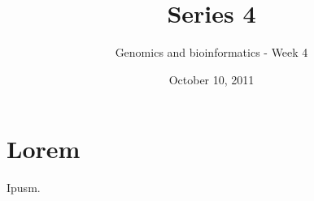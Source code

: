 \documentclass[a4paper,11pt]{article}
\title{Series 4}
\date{October 10, 2011}
\author{Genomics and bioinformatics - Week 4}
\begin{document}
\maketitle

\section{Lorem}
Ipusm.
\end{document}
